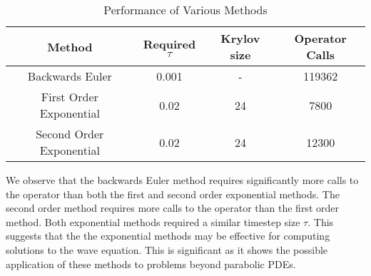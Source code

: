 \begin{table}[H]
    \centering
    \begin{tabular}{| c | c | c | c |}
    \hline
    Method & Required $\tau$ & Krylov size & Operator Calls\\
    \hline
    Backwards Euler & 0.001 & - & 119362 \\
    First Order Exponential & 0.02 & 24 & 7800 \\
    Second Order Exponential & 0.02 & 24 & 12300 \\
    \hline
    \end{tabular}
    \caption{Performance of Various Methods}
    \label{tab:reduced_data}
\end{table}

We observe that the backwards Euler method requires significantly more calls to the operator than both the first and second order exponential methods.
The second order method requires more calls to the operator than the first order method.
Both exponential methods required a similar timestep size $\tau$.
This suggests that the the exponential methods may be effective for computing solutions to the wave equation.
This is significant as it shows the possible application of these methods to problems beyond parabolic PDEs.